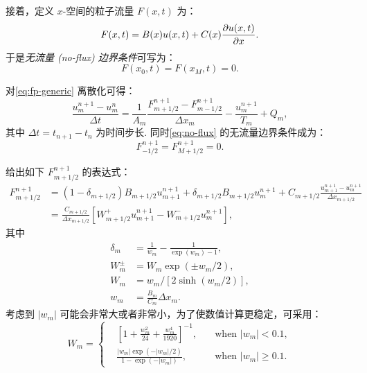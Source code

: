接着，定义 $x$-空间的粒子流量 $F(x,t)$ 为：
\begin{equation}
  \label{eq:fp-f}
  F(x,t) = B(x) u(x,t) + C(x) \frac{\partial u(x,t)}{\partial x} .
\end{equation}
于是\emph{无流量 (no-flux) 边界条件}可写为\cite{park1995}：
\begin{equation}
  \label{eq:no-flux}
  F(x_0, t) = F(x_M, t) = 0 .
\end{equation}

对\autoref{eq:fp-generic} 离散化可得：
\begin{equation}
  \label{eq:fp-disc}
  \frac{u_m^{n+1} - u_m^n}{\Delta t}
    = \frac{1}{A_m} \frac{F_{m+1/2}^{n+1} - F_{m-1/2}^{n+1}}{\Delta x_m}
      - \frac{u_m^{n+1}}{T_m} + Q_m ,
\end{equation}
其中 $\Delta t = t_{n+1} - t_n$ 为时间步长.
同时\autoref{eq:no-flux} 的无流量边界条件成为：
\begin{equation}
  \label{eq:no-flux-disc}
  F_{-1/2}^{n+1} = F_{M+1/2}^{n+1} = 0 .
\end{equation}

 给出如下 $F_{m+1/2}^{n+1}$ 的表达式：
\begin{align}
  \label{eq:fp-f-chang70}
  F_{m+1/2}^{n+1} & = (1 - \delta_{m+1/2}) B_{m+1/2} u_{m+1}^{n+1}
      + \delta_{m+1/2} B_{m+1/2} u_m^{n+1}
      + C_{m+1/2} \frac{u_{m+1}^{n+1} - u_m^{n+1}}{\Delta x_{m+1/2}} \\
    & = \frac{C_{m+1/2}}{\Delta x_{m+1/2}} \left[
      W_{m+1/2}^{+} u_{m+1}^{n+1} - W_{m+1/2}^{-} u_m^{n+1} \right] ,
\end{align}
其中
\begin{align}
  \delta_m & = \frac{1}{w_m} - \frac{1}{\exp(w_m) - 1} ,
    \label{eq:fp-delta-m} \\
  W_m^{\pm} & = W_m \exp(\pm w_m / 2) ,
    \label{eq:fp-Wm-pm} \\
  W_m & = w_m \big/ [2 \sinh(w_m / 2)] ,
    \label{eq:fp-Wm} \\
  w_m & = \frac{B_m}{C_m} \Delta x_m .
    \label{eq:fp-wm}
\end{align}
考虑到 $|w_m|$ 可能会非常大或者非常小，为了使数值计算更稳定，可采用\cite{park1996}：
\begin{equation}
  \label{eq:fp-Wm-calc}
  W_m = \left\{
    \begin{alignedat}{2}
      & \left[ 1 + \frac{w_m^2}{24} + \frac{w_m^4}{1920} \right]^{-1} ,
        & \quad\text{when~} |w_m| < 0.1 , \\
      & \frac{|w_m| \exp(-|w_m|/2)}{1 - \exp(-|w_m|)} ,
        & \quad\text{when~} |w_m| \ge 0.1 .
    \end{alignedat}
  \right.
\end{equation}

